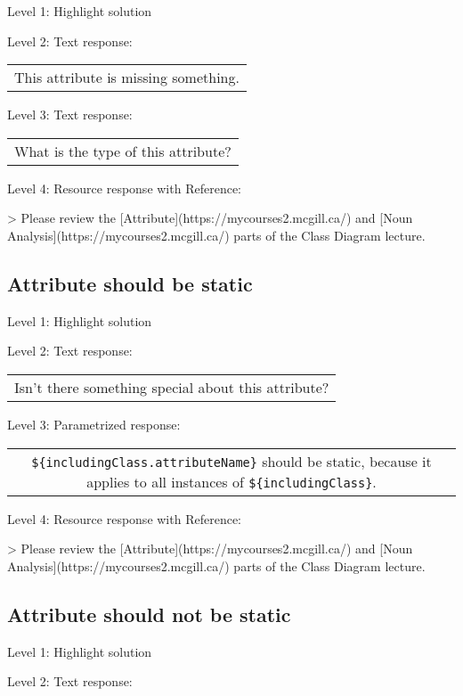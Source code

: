 \noindent Level 1: Highlight solution \medskip

\noindent Level 2: Text response: \medskip

\begin{tabular}{|c}
This attribute is missing something.
\end{tabular} \medskip

\noindent Level 3: Text response: \medskip

\begin{tabular}{|c}
What is the type of this attribute?
\end{tabular} \medskip

\noindent Level 4: Resource response with Reference:

> Please review the [Attribute](https://mycourses2.mcgill.ca/) and [Noun Analysis](https://mycourses2.mcgill.ca/) parts of the Class Diagram lecture.


\subsection{Attribute should be static}

\noindent Level 1: Highlight solution \medskip

\noindent Level 2: Text response: \medskip

\begin{tabular}{|c}
Isn't there something special about this attribute?
\end{tabular} \medskip

\noindent Level 3: Parametrized response: \medskip

\begin{tabular}{|c}
\verb|${includingClass.attributeName}| should be static, because it applies to all instances of \verb|${includingClass}|.
\end{tabular} \medskip

\noindent Level 4: Resource response with Reference:

> Please review the [Attribute](https://mycourses2.mcgill.ca/) and [Noun Analysis](https://mycourses2.mcgill.ca/) parts of the Class Diagram lecture.


\subsection{Attribute should not be static}

\noindent Level 1: Highlight solution \medskip

\noindent Level 2: Text response: \medskip

